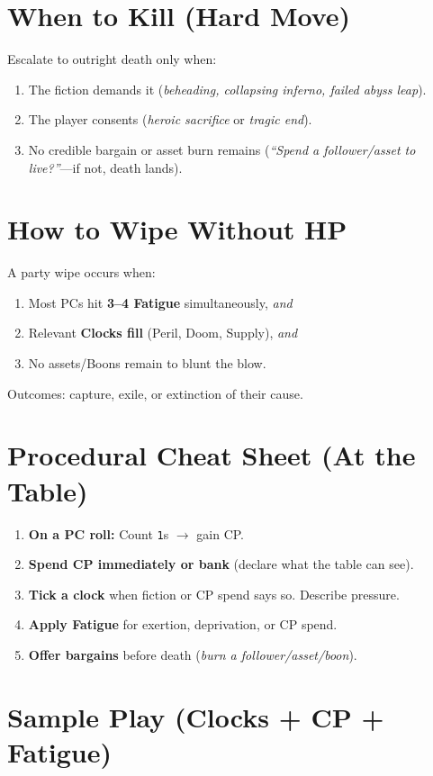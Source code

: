 \documentclass[12pt]{article}
\begin{document}
\section{When to Kill (Hard Move)}
Escalate to outright death only when:
\begin{enumerate}
  \item The fiction demands it (\emph{beheading, collapsing inferno, failed abyss leap}).
  \item The player consents (\emph{heroic sacrifice} or \emph{tragic end}).
  \item No credible bargain or asset burn remains (\emph{``Spend a follower/asset to live?''}---if not, death lands).
\end{enumerate}

\section{How to Wipe Without HP}
A party wipe occurs when:
\begin{enumerate}
  \item Most PCs hit \textbf{3--4 Fatigue} simultaneously, \emph{and}
  \item Relevant \textbf{Clocks fill} (Peril, Doom, Supply), \emph{and}
  \item No assets/Boons remain to blunt the blow.
\end{enumerate}
Outcomes: capture, exile, or extinction of their cause.

\section{Procedural Cheat Sheet (At the Table)}
\begin{enumerate}
  \item \textbf{On a PC roll:} Count \texttt{1}s $\rightarrow$ gain CP.
  \item \textbf{Spend CP immediately or bank} (declare what the table can see).
  \item \textbf{Tick a clock} when fiction or CP spend says so. Describe pressure.
  \item \textbf{Apply Fatigue} for exertion, deprivation, or CP spend.
  \item \textbf{Offer bargains} before death (\emph{burn a follower/asset/boon}).
\end{enumerate}

\section{Sample Play (Clocks + CP + Fatigue)}
\end{document}
